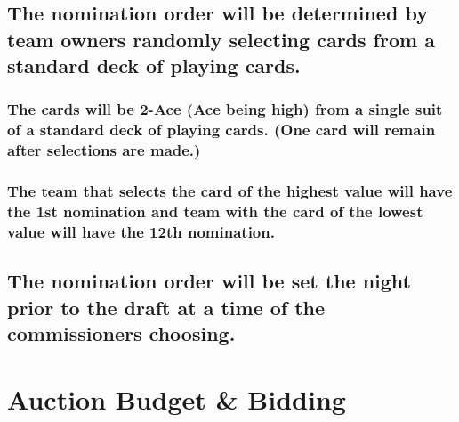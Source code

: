 \documentclass[
]{book}
\begin{document}
\hypertarget{the-nomination-order-will-be-determined-by-team-owners-randomly-selecting-cards-from-a-standard-deck-of-playing-cards.}{%
\subsection{The nomination order will be determined by team owners randomly selecting cards from a standard deck of playing cards.}\label{the-nomination-order-will-be-determined-by-team-owners-randomly-selecting-cards-from-a-standard-deck-of-playing-cards.}}

\hypertarget{the-cards-will-be-2-ace-ace-being-high-from-a-single-suit-of-a-standard-deck-of-playing-cards.-one-card-will-remain-after-selections-are-made.}{%
\subsubsection{The cards will be 2-Ace (Ace being high) from a single suit of a standard deck of playing cards. (One card will remain after selections are made.)}\label{the-cards-will-be-2-ace-ace-being-high-from-a-single-suit-of-a-standard-deck-of-playing-cards.-one-card-will-remain-after-selections-are-made.}}

\hypertarget{the-team-that-selects-the-card-of-the-highest-value-will-have-the-1st-nomination-and-team-with-the-card-of-the-lowest-value-will-have-the-12th-nomination.}{%
\subsubsection{The team that selects the card of the highest value will have the 1st nomination and team with the card of the lowest value will have the 12th nomination.}\label{the-team-that-selects-the-card-of-the-highest-value-will-have-the-1st-nomination-and-team-with-the-card-of-the-lowest-value-will-have-the-12th-nomination.}}

\hypertarget{the-nomination-order-will-be-set-the-night-prior-to-the-draft-at-a-time-of-the-commissioners-choosing.}{%
\subsection{The nomination order will be set the night prior to the draft at a time of the commissioners choosing.}\label{the-nomination-order-will-be-set-the-night-prior-to-the-draft-at-a-time-of-the-commissioners-choosing.}}

\hypertarget{auction-budget-bidding}{%
\section{Auction Budget \& Bidding}\label{auction-budget-bidding}}
\end{document}
